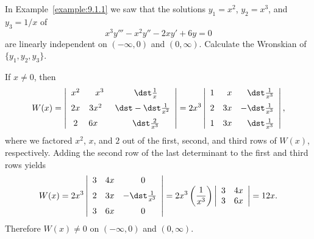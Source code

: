 \setcounter{example}{2}
\begin{example}
  \label{example:9.1.3} \rm In Example~\ref{example:9.1.1} we saw that the solutions $y_{1}=x^{2}$,
  $y_{2}=x^{3}$, and $y_{3}=1/x$ of
  \[
    x^{3}y'''-x^{2}y''-2xy'+6y=0
  \]
  are linearly independent on $(-\infty,0)$ and $(0,\infty)$. Calculate the Wronskian of
  $\{y_{1},y_{2},y_{3}\}$.
\end{example}
\begin{examplesolution}
\solution If $x\ne0$, then
\[
  W(x)=\left|
  \begin{array}{ccc}
    x^{2} & \phantom{2}x^{3}     & \phantom{-}\dst\frac{1}{x}     \\[2\jot]
    2x    & 3x^{2}\phantom{^{2}} & \dst-\dst\frac{1}{x^{2}}       \\[2\jot]
    2     & 6x\phantom{x^{2}}    & \phantom{-}\dst\frac{2}{x^{3}}
  \end{array}
  \right| =2x^{3}\left|
  \begin{array}{ccc}
    1 & \phantom{3}x & \phantom{-}\dst\frac{1}{x^{3}} \\[2\jot]
    2 & 3x           & -\dst\frac{1}{x^{3}}           \\[2\jot]
    1 & 3x           & \phantom{-}\dst\frac{1}{x^{3}}
  \end{array}\right|,
\]
where we factored $x^{2}$, $x$, and $2$ out of the first, second, and third rows of $W(x)$,
respectively. Adding the second row of the last determinant to the first and third rows yields
\[
  W(x)=2x^{3}\left|
  \begin{array}{ccc}
    3 & 4x & \phantom{-}0         \\[2\jot]
    2 & 3x & -\dst\frac{1}{x^{3}} \\[2\jot]
    3 & 6x & \phantom{-}0
  \end{array}\right| =2x^{3}\left(\frac{1}{x^{3}}\right)\left|
  \begin{array}{cc}
    3 & 4x \\
    3 & 6x
  \end{array}\right|=12x.
\]
Therefore $W(x)\ne0$ on $(-\infty,0)$ and $(0,\infty)$.
\end{examplesolution}


